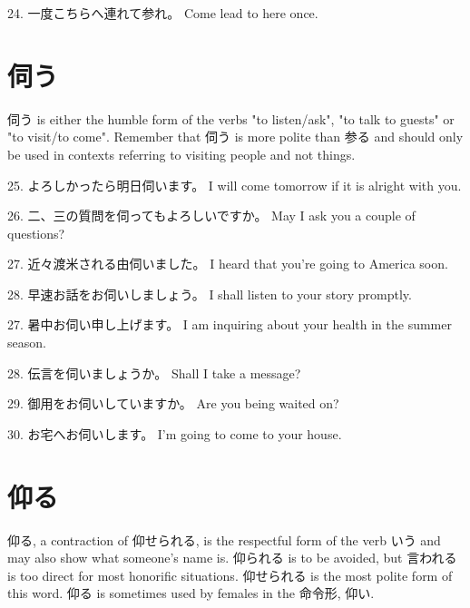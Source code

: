 \par{24. 一度こちらへ連れて参れ。 \hfill\break
Come lead to here once. }
      
\section{伺う}
 
\par{ 伺う is either the humble form of the verbs "to listen\slash ask", "to talk to guests" or "to visit\slash to come". Remember that 伺う is more polite than 参る and should only be used in contexts referring to visiting people and not things. }

\par{25. よろしかったら明日伺います。 \hfill\break
I will come tomorrow if it is alright with you. }

\par{26. 二、三の質問を伺ってもよろしいですか。 \hfill\break
May I ask you a couple of questions? }

\par{27. 近々渡米される由伺いました。 \hfill\break
I heard that you're going to America soon. }

\par{28. 早速お話をお伺いしましょう。 \hfill\break
I shall listen to your story promptly. }

\par{27. 暑中お伺い申し上げます。 \hfill\break
I am inquiring about your health in the summer season. }

\par{28. 伝言を伺いましょうか。 \hfill\break
Shall I take a message? }

\par{29. 御用をお伺いしていますか。 \hfill\break
Are you being waited on? }

\par{30. お宅へお伺いします。 \hfill\break
I'm going to come to your house. }
      
\section{仰る}
 
\par{ 仰る, a contraction of 仰せられる, is the respectful form of the verb いう and may also show what someone's name is. 仰られる is to be avoided, but 言われる is too direct for most honorific situations. 仰せられる is the most polite form of this word. 仰る is sometimes used by females in the 命令形, 仰い. }

